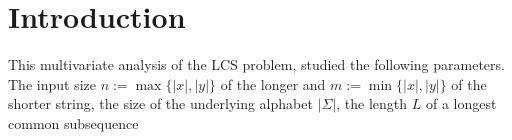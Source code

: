 \section{Introduction}

This multivariate analysis of the LCS problem, studied the following parameters.
The input size $n := \max\{|x|, |y|\}$ of the longer and $m := \min\{|x|, |y|\}$ of the shorter string, the size of the underlying alphabet $|\Sigma|$, the length $L$ of a longest common subsequence

